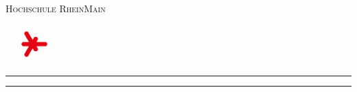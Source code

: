\begin{titlepage}
	\newcommand{\HRule}{\rule{\linewidth}{0.5mm}} 	
	\centering
	\textsc{\Large Hochschule RheinMain} \par
	\begin{center}
		\includegraphics[width=0.15\textwidth]{logo-hsrm.jpg}
	\end{center}%
	\textsc{\LARGE \titelLV}\vspace{0.5cm}
		\HRule\vspace{0.4cm}
	{\huge\bfseries \untertitela}\par\vspace{0.4cm} %
	{\huge\bfseries \untertitelb}\par\vspace{0.4cm} %
		\HRule\vspace{1.5cm}
	\begin{minipage}{0.4\textwidth}
		\large
		\textsc{\nameA}\par\vspace{0.5cm}
		\textsc{\nameB}\par\vspace{0.5cm}
		\textsc{\nameC}\par\vspace{0.5cm}

\end{minipage}
\end{titlepage}
